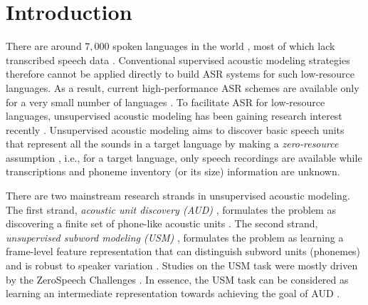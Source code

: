 \documentclass[a4paper]{article}
\begin{document}
\section{Introduction}
There are around $7,000$ spoken languages in the world \cite{austin2011cambridge}, most of which lack transcribed speech data \cite{adda2016breaking}. Conventional supervised acoustic modeling strategies \cite{dahl2011context,chan2016listen} therefore cannot be applied directly to build ASR systems for such low-resource languages. As a result, current high-performance ASR schemes are available only for a very small number of languages \cite{feng2021how}.
To facilitate ASR for low-resource languages,  unsupervised acoustic modeling  has been gaining research interest  recently \cite{lee2012a,I3EWang,chen2015parallel}.  Unsupervised acoustic modeling aims to discover basic speech units that represent  all the sounds in a target language by making a  \textit{zero-resource} assumption  \cite{dunbar2017zero}, i.e., for a target language, only speech recordings are available while transcriptions and phoneme inventory (or its size) information are unknown. 

There are two mainstream research strands in unsupervised acoustic modeling. The first strand, \textit{acoustic unit discovery (AUD)} \cite{ondel2016variational,lee2012a}, formulates the problem as discovering a finite set of phone-like acoustic units \cite{lee2012a,I3EWang,Ondel2019Bayesian}. 
The second strand, \textit{unsupervised subword modeling (USM)} \cite{dunbar2017zero,Dunbar2019}, formulates the problem as learning a frame-level feature representation  that can distinguish subword units (phonemes)  and is robust to speaker variation \cite{chen2015parallel,oord2017neural,heck2017feature}. 
Studies on the USM task were mostly driven by the 
ZeroSpeech Challenges
\cite{dunbar2017zero,Dunbar2019,Dunbar2020zero}. 
In essence, the USM task can be considered as learning an intermediate representation towards achieving the goal of AUD \cite{Feng2019combining}. 
\end{document}
